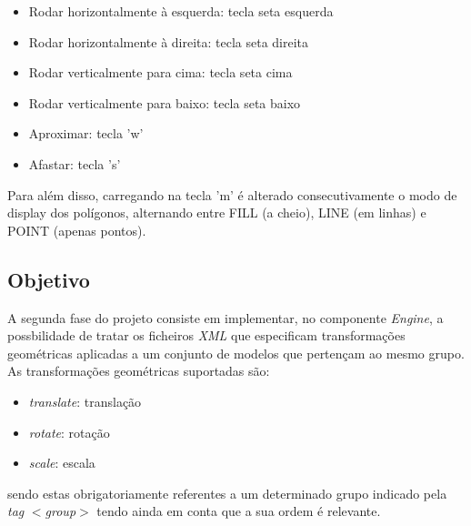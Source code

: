 \documentclass{article}
\begin{document}
\begin{itemize}
    \item Rodar horizontalmente à esquerda: tecla seta esquerda
    \item Rodar horizontalmente à direita: tecla seta direita
    \item Rodar verticalmente para cima: tecla seta cima
    \item Rodar verticalmente para baixo: tecla seta baixo
    \item Aproximar: tecla 'w'
    \item Afastar: tecla 's'
\end{itemize}
Para além disso, carregando na tecla 'm' é alterado consecutivamente o modo de display dos polígonos, alternando entre FILL (a cheio), LINE (em linhas) e POINT (apenas pontos).

\newpage

\subsection{Objetivo}
A segunda fase do projeto consiste em implementar, no componente \textit{Engine}, a possbilidade de tratar os ficheiros \textit{XML} que especificam transformações geométricas aplicadas a um conjunto de modelos que pertençam ao mesmo grupo. 
\newline
As transformações geométricas suportadas são:
\begin{itemize}
    \item \textit{translate}: translação 
    \item \textit{rotate}: rotação
    \item \textit{scale}: escala 
\end{itemize}
sendo estas obrigatoriamente referentes a um determinado grupo indicado pela \textit{tag} \textit{$<$group$>$} tendo ainda em conta que a sua ordem é relevante.
\end{document}
